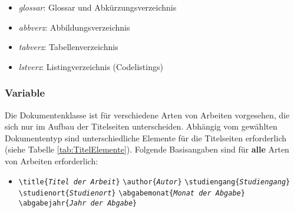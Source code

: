 \begin{itemize}

  \item \textit{glossar}: Glossar und Abkürzungsverzeichnis
  \item \textit{abbverz}: Abbildungsverzeichnis
  \item \textit{tabverz}: Tabellenverzeichnis
  \item \textit{lstverz}: Listingverzeichnis (Codelistings)

\end{itemize}




\subsubsection{Variable}

Die Dokumentenklasse ist für verschiedene Arten von Arbeiten vorgesehen, die sich nur im Aufbau 
der Titelseiten unterscheiden. 
Abhängig vom gewählten Dokumententyp sind unterschiedliche Elemente für die Titelseiten erforderlich (siehe Tabelle \ref{tab:TitelElemente}).
Folgende Basisangaben sind für \textbf{alle} Arten von Arbeiten
erforderlich:
%
\begin{itemize}
\item[] %
\verb!\title{!\texttt{\em Titel der Arbeit}\verb!}! \newline%
\verb!\author{!\texttt{\em Autor}\verb!}! \newline%
\verb!\studiengang{!\texttt{\em Studiengang}\verb!}! \newline%
\verb!\studienort{!\texttt{\em Studienort}\verb!}! \newline%
\verb!\abgabemonat{!\texttt{\em Monat der Abgabe}\verb!}! \newline%
\verb!\abgabejahr{!\texttt{\em Jahr der Abgabe}\verb!}!
\end{itemize}
%



